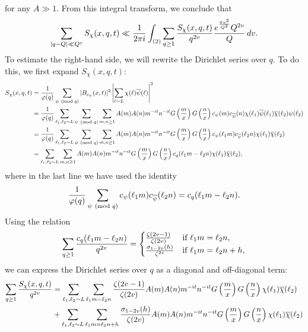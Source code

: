 \documentclass[12pt,reqno,oneside]{amsart}
\begin{document}
    for any $A \gg 1$. From this integral transform, we conclude that
    \[
      \sum_{|q-Q| \ll Q^{\varepsilon}}S_{\chi}(x,q,t) \ll \frac{1}{2\pi i}\int_{(2)}\sum_{q \ge 1}\frac{S_{\chi}(x,q,t)}{q^{2v}}\frac{e^{\frac{\pi v^{2}}{Q^{2}}}Q^{2v}}{Q}\,dv.
    \]
    To estimate the right-hand side, we will rewrite the Dirichlet series over $q$. To do this, we first expand $S_{\chi}(x,q,t)$:
    \begin{align*}
      S_{\chi}(x,q,t) &= \frac{1}{\varphi(q)}\sum_{\psi \ \left(\text{mod }q\right)}|B_{c_{\psi}}(x,t)|^{2}\left|\sum_{\ell \sim L}\chi(\ell)\overline{\psi}(\ell)\right|^{2} \\
      &= \frac{1}{\varphi(q)}\sum_{\ell_{1},\ell_{2} \sim L}\sum_{\psi \ \left(\text{mod }q\right)}\sum_{m,n \ge 1}A(m)A(n)m^{-it}n^{-it}G\left(\frac{m}{x}\right)G\left(\frac{n}{x}\right)c_{\psi}(m)c_{\overline{\psi}}(n)\chi(\ell_{1})\overline{\psi}(\ell_{1})\overline{\chi}(\ell_{2})\psi(\ell_{2}) \\
      &= \frac{1}{\varphi(q)}\sum_{\ell_{1},\ell_{2} \sim L}\sum_{\psi \ \left(\text{mod }q\right)}\sum_{m,n \ge 1}A(m)A(n)m^{-it}n^{-it}G\left(\frac{m}{x}\right)G\left(\frac{n}{x}\right)c_{\psi}(\ell_{1}m)c_{\overline{\psi}}(\ell_{2}n)\chi(\ell_{1})\overline{\chi}(\ell_{2}) \\
      &= \sum_{\ell_{1},\ell_{2} \sim L}\sum_{m,n \ge 1}A(m)A(n)m^{-it}n^{-it}G\left(\frac{m}{x}\right)G\left(\frac{n}{x}\right)c_{q}(\ell_{1}m-\ell_{2}n)\chi(\ell_{1})\overline{\chi}(\ell_{2}),
    \end{align*}
    where in the last line we have used the identity
    \[
      \frac{1}{\varphi(q)}\sum_{\psi \ \left(\text{mod }q\right)}c_{\psi}(\ell_{1}m)c_{\overline{\psi}}(\ell_{2}n) = c_{q}(\ell_{1}m-\ell_{2}n).
    \]
    Using the relation
    \[
      \sum_{q \ge 1}\frac{c_{q}(\ell_{1}m-\ell_{2}n)}{q^{2v}} = \begin{cases} \frac{\zeta(2v-1)}{\zeta(2v)} & \text{if $\ell_{1}m = \ell_{2}n$}, \\ \frac{\sigma_{1-2v}(h)}{\zeta^{2v}} & \text{if $\ell_{1}m = \ell_{2}n+h$}, \end{cases}
    \]
    we can express the Dirichlet series over $q$ as a diagonal and off-diagonal term:
    \begin{align*}
      \sum_{q \ge 1}\frac{S_{\chi}(x,q,t)}{q^{2v}} &= \sum_{\ell_{1},\ell_{2} \sim L}\sum_{\ell_{1}m = \ell_{2}n}\frac{\zeta(2v-1)}{\zeta(2v)}A(m)A(n)m^{-it}n^{-it}G\left(\frac{m}{x}\right)G\left(\frac{n}{x}\right)\chi(\ell_{1})\overline{\chi}(\ell_{2}) \\
      &+\sum_{\ell_{1},\ell_{2} \sim L}\sum_{\ell_{1}m = \ell_{2}n+h}\frac{\sigma_{1-2v}(h)}{\zeta(2v)}A(m)A(n)m^{-it}n^{-it}G\left(\frac{m}{x}\right)G\left(\frac{n}{x}\right)\chi(\ell_{1})\overline{\chi}(\ell_{2})
    \end{align*}
\end{document}

